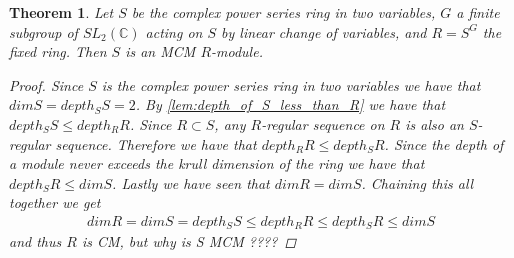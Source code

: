 \documentclass[11pt, a4paper, english]{article}
\numberwithin{prop}{section}
\numberwithin{lemma}{section}
\newtheorem{theorem}{Theorem}
\numberwithin{theorem}{section}
\numberwithin{defin}{section}
\numberwithin{example}{section}
\newcommand{\C}{\mathbb{C}}
\begin{document}
\begin{theorem}
Let $S$ be the complex power series ring in two variables, $G$ a finite subgroup of $SL_2(\C)$ acting on $S$ by linear change of variables, and $R=S^G$ the fixed ring. Then $S$ is an MCM $R$-module.
\begin{proof}
Since $S$ is the complex power series ring in two variables we have that $dim S = depth_SS=2$. By \cref{lem:depth_of_S_less_than_R} we have that $depth_SS \leq depth_RR$. Since $R \subset S$, any $R$-regular sequence on $R$ is also an $S$-regular sequence. Therefore we have that $depth_RR \leq depth_SR$. Since the depth of a module never exceeds the krull dimension of the ring we have that $depth_SR \leq dim S$. Lastly we have seen that $dim R = dim S$. Chaining this all together we get
\begin{align*}
dim R = dim S = depth_SS \leq depth_RR \leq depth_SR \leq dim S
\end{align*}
and thus $R$ is CM, but why is S MCM {\color{red} ????}
\end{proof}
\end{theorem}
\end{document}
